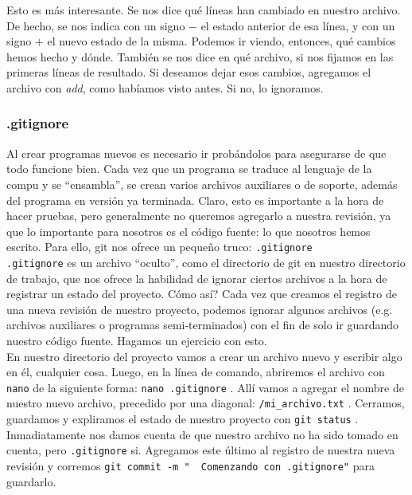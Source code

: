 \documentclass[10pt,letterpaper]{article}
\newcommand{\inlinecode}[1]{
\colorbox{light-gray}{\texttt{#1}}
}
\begin{document}
Esto es m\'as interesante. Se nos dice qu\'e l\'ineas han cambiado en nuestro archivo. De hecho, se nos indica con un signo $-$ el estado anterior de esa l\'inea, y con un signo $+$ el nuevo estado de la misma. Podemos ir viendo, entonces, qu\'e cambios hemos hecho y d\'onde. Tambi\'en se nos dice en qu\'e archivo, si nos fijamos en las primeras l\'ineas de resultado. Si deseamos dejar esos cambios, agregamos el archivo con \emph{add}, como hab\'iamos visto antes. Si no, lo ignoramos.

\subsubsection{.gitignore}
Al crear programas nuevos es necesario ir prob\'andolos para asegurarse de que todo funcione bien. Cada vez que un programa se traduce al lenguaje de la compu y se ``ensambla'', se crean varios archivos auxiliares o de soporte, adem\'as del programa en versi\'on ya terminada. Claro, esto es importante a la hora de hacer pruebas, pero generalmente no queremos agregarlo a nuestra revisi\'on, ya que lo importante para nosotros es el c\'odigo fuente: lo que nosotros hemos escrito. Para ello, git nos ofrece un peque\~no truco: \inlinecode{.gitignore}\\

\inlinecode{.gitignore} es un archivo ``oculto'', como el directorio de git en nuestro directorio de trabajo, que nos ofrece la habilidad de ignorar ciertos archivos a la hora de registrar un estado del proyecto. C\'omo as\'i? Cada vez que creamos el registro de una nueva revisi\'on de nuestro proyecto, podemos ignorar algunos archivos (e.g. archivos auxiliares o programas semi-terminados) con el fin de solo ir guardando nuestro c\'odigo fuente. Hagamos un ejercicio con esto.\\

En nuestro directorio del proyecto vamos a crear un archivo nuevo y escribir algo en \'el, cualquier cosa. Luego, en la l\'inea de comando, abriremos el archivo con \inlinecode{nano} de la siguiente forma: \inlinecode{nano .gitignore}. All\'i vamos a agregar el nombre de nuestro nuevo archivo, precedido por una diagonal: \inlinecode{/mi\_archivo.txt}. Cerramos, guardamos y expliramos el estado de nuestro proyecto con \inlinecode{git status}. Inmadiatamente nos damos cuenta de que nuestro archivo no ha sido tomado en cuenta, pero \inlinecode{.gitignore} si. Agregamos este \'ultimo al registro de nuestra nueva revisi\'on y corremos \inlinecode{git commit -m "\ \hspace{-1em} Comenzando con .gitignore"} para guardarlo.
\end{document}
